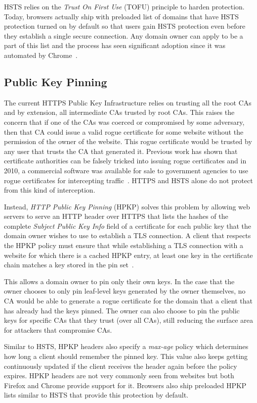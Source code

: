 HSTS relies on the \emph{Trust On First Use} (TOFU) principle to harden
protection. Today, browsers actually ship with preloaded list of domains that
have HSTS protection turned on by default so that users gain HSTS protection
even before they establish a single secure connection. Any domain owner can
apply to be a part of this list and the process has seen significant adoption
since it was automated by Chrome~\cite{hstspreload}.


\subsection{Public Key Pinning}
The current HTTPS Public Key Infrastructure relies on trusting all the root CAs
and by extension, all intermediate CAs trusted by root CAs. This raises the
concern that if one of the CAs was coerced or compromised by some adversary,
then that CA could issue a valid rogue certificate for some website without the
permission of the owner of the website. This rogue certificate would be trusted
by any user that trusts the CA that generated it. Previous work has shown that
certificate authorities can be falsely tricked into issuing rogue certificates
and in 2010, a commercial software was available for sale to government
agencies to use rogue certificates for intercepting
traffic~\cite{commercial-government}. HTTPS and HSTS alone do not protect from
this kind of interception.

Instead, \emph{HTTP Public Key Pinning} (HPKP) solves this problem by allowing web
servers to serve an HTTP header over HTTPS that lists the hashes of the
complete \emph{Subject Public Key Info} field of a certificate for each public key
that the domain owner wishes to use to establish a TLS connection. A client
that respects the HPKP policy must ensure that while establishing a TLS
connection with a website for which there is a cached HPKP entry, at least one
key in the certificate chain matches a key stored in the pin set~\cite{RFC7469}.

This allows a domain owner to pin only their own keys. In the case that the
owner chooses to only pin leaf-level keys generated by the owner themselves, no
CA would be able to generate a rogue certificate for the domain that a client
that has already had the keys pinned. The owner can also choose to pin the
public keys for specific CAs that they trust (over all CAs), still reducing the
surface area for attackers that compromise CAs.

Similar to HSTS, HPKP headers also specify a \emph{max-age} policy which
determines how long a client should remember the pinned key. This value also
keeps getting continuously updated if the client receives the header again
before the policy expires. HPKP headers are not very commonly seen from
websites but both Firefox and Chrome provide support for it. Browsers also
ship preloaded HPKP lists similar to HSTS that provide this protection
by default.

